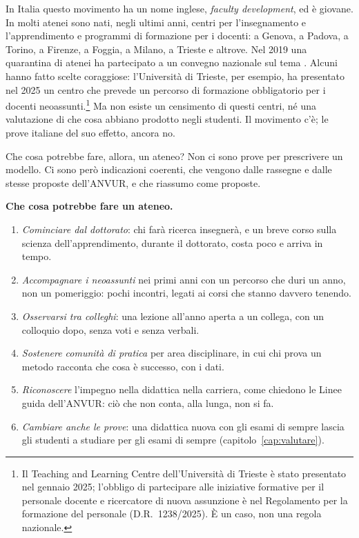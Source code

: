 In Italia questo movimento ha un nome inglese, \emph{faculty
development}, ed è giovane. In molti atenei sono nati, negli ultimi
anni, centri per l'insegnamento e l'apprendimento e programmi di
formazione per i docenti: a Genova, a Padova, a Torino, a Firenze, a
Foggia, a Milano, a Trieste e altrove. Nel 2019 una quarantina di
atenei ha partecipato a un convegno nazionale sul tema
\parencite{lotti2020}. Alcuni hanno fatto scelte coraggiose:
l'Università di Trieste, per esempio, ha presentato nel 2025 un centro
che prevede un percorso di formazione obbligatorio per i docenti
neoassunti.\footnote{Il Teaching and Learning Centre dell'Università di Trieste è stato presentato nel gennaio 2025; l'obbligo di partecipare alle iniziative formative per il personale docente e ricercatore di nuova assunzione è nel Regolamento per la formazione del personale (D.R.~1238/2025). È un caso, non una regola nazionale.} Ma non esiste un censimento di questi centri, né
una valutazione di che cosa abbiano prodotto negli studenti. Il
movimento c'è; le prove italiane del suo effetto, ancora no.

Che cosa potrebbe fare, allora, un ateneo? Non ci sono prove per
prescrivere un modello. Ci sono però indicazioni coerenti, che vengono
dalle rassegne e dalle stesse proposte dell'ANVUR, e che riassumo come
proposte.

\begin{inpratica}
\textbf{Che cosa potrebbe fare un ateneo.}
\begin{enumerate}
  \item \emph{Cominciare dal dottorato}: chi farà ricerca insegnerà, e
        un breve corso sulla scienza dell'apprendimento, durante il
        dottorato, costa poco e arriva in tempo.
  \item \emph{Accompagnare i neoassunti} nei primi anni con un
        percorso che duri un anno, non un pomeriggio: pochi incontri,
        legati ai corsi che stanno davvero tenendo.
  \item \emph{Osservarsi tra colleghi}: una lezione all'anno aperta a
        un collega, con un colloquio dopo, senza voti e senza
        verbali.
  \item \emph{Sostenere comunità di pratica} per area disciplinare,
        in cui chi prova un metodo racconta che cosa è successo, con i
        dati.
  \item \emph{Riconoscere} l'impegno nella didattica nella carriera,
        come chiedono le Linee guida dell'ANVUR: ciò che non conta,
        alla lunga, non si fa.
  \item \emph{Cambiare anche le prove}: una didattica nuova con gli
        esami di sempre lascia gli studenti a studiare per gli esami
        di sempre (capitolo~\ref{cap:valutare}).
\end{enumerate}
\end{inpratica}


